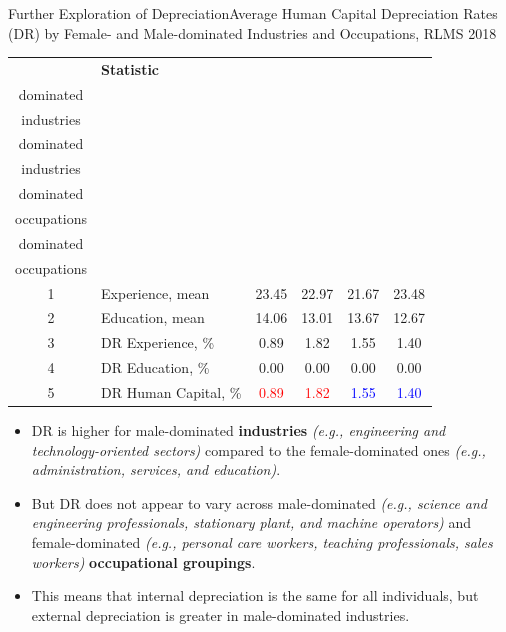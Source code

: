 \documentclass{beamer}
\begin{document}
\begin{frame}{Further Exploration of Depreciation}{Average Human Capital Depreciation Rates (DR) by Female- and Male-dominated Industries and Occupations, RLMS 2018}
		\fontsize{9}{11}\selectfont
		\centering 
		\label{tab:3.3} 
		\begin{tabularx}{\textwidth}{cl|cc|cc}
			\hline
			& \textbf{Statistic}
			& \textbf{\begin{tabular}[c]{@{}c@{}} Female-\\dominated \\ industries \end{tabular}}
			& \textbf{\begin{tabular}[c]{@{}c@{}} Male-\\dominated \\ industries \end{tabular}}
			& \textbf{\begin{tabular}[c]{@{}c@{}} Female-\\dominated \\ occupations \end{tabular}}
			& \textbf{\begin{tabular}[c]{@{}c@{}} Male-\\dominated \\ occupations \end{tabular}} \\ 
			\hline
			1 & Experience, mean  & 23.45 & 22.97 & 21.67 & 23.48 \\ 
			2 & Education, mean & 14.06 & 13.01 & 13.67 & 12.67 \\ 
			\hline
			3 & DR Experience, \% & 0.89 & 1.82 & 1.55 & 1.40 \\ 
			4 & DR Education, \% & 0.00 & 0.00 & 0.00 & 0.00 \\ 
			5 & DR Human Capital, \% & \textcolor{red}{0.89} & \textcolor{red}{1.82}
			 & \textcolor{blue}{1.55} & \textcolor{blue}{1.40} \\ 
			\hline
		\end{tabularx}
	 \fontsize{8}{10}\selectfont
	\begin{itemize}
		\item DR is higher for male-dominated \textbf{industries} \textit{(e.g., engineering and technology-oriented sectors)} compared to the female-dominated ones \textit{(e.g., administration, services, and education)}.
		\item But DR does not appear to vary across male-dominated \textit{(e.g., science and engineering professionals, stationary plant, and machine operators)} and female-dominated \textit{(e.g., personal care workers, teaching professionals, sales workers)} \textbf{occupational groupings}.
		\item This means that internal depreciation is the same for all individuals, but external depreciation is greater in male-dominated industries. 
	\end{itemize}
\end{frame}
\end{document}
